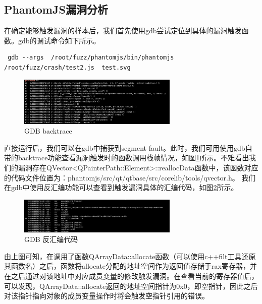 \documentclass[doctor,privacy,twoside]{buaa_mac}
\begin{document}
\subsection{PhantomJS漏洞分析}

在确定能够触发漏洞的样本后，我们首先使用gdb尝试定位到具体的漏洞触发函数。gdb的调试命令如下所示。

\lstset{language=JavaScript}
\begin{lstlisting}
 gdb --args  /root/fuzz/phantomjs/bin/phantomjs /root/fuzz/crash/test2.js  test.svg 
 \end{lstlisting}
 
\centerline{}
\begin{figure}[!h]
  \centering
  \includegraphics[width=0.68\textwidth]{images/gdb_backtrace.png}
  \caption{GDB backtrace}
  \label{fig:bt}
\end{figure}

 直接运行后，我们可以在gdb中捕获到segment fault。此时，我们可用使用gdb自带的backtrace功能查看漏洞触发时的函数调用栈帧情况，如图\ref{fig:bt}所示。不难看出我们的漏洞存在QVector<QPainterPath::Element>::reallocData函数中，该函数对应的代码文件位置为：phantomjs/src/qt/qtbase/src/corelib/tools/qvector.h。 我们在gdb中使用反汇编功能可以查看到触发漏洞具体的汇编代码，如图\ref{fig:gdb}所示。
 
\centerline{}
\begin{figure}[!h]
  \centering
  \includegraphics[width=0.68\textwidth]{images/gdb_disassemble.png}
  \caption{GDB 反汇编代码}
  \label{fig:gdb}
\end{figure}

 
 由上图可知，在调用了函数QArrayData::allocate函数（可以使用c++filt工具还原其函数名）之后，函数将allocate分配的地址空间作为返回值存储于rax寄存器，并在之后通过对该地址中对应成员变量的修改触发漏洞。在查看当前的寄存器值后，可以发现，QArrayData::allocate返回的地址空间指针为0x0，即空指针，因此之后对该指针指向对象的成员变量操作时将会触发空指针引用的错误。
 
\end{document}
